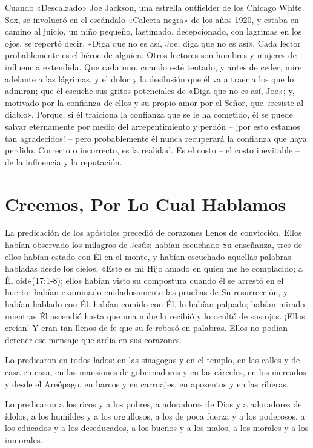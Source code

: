 \documentclass[12pt, twoside, openright]{book}
\begin{document}
Cuando «Descalzado» Joe Jackson, una estrella outfielder de los Chicago White Sox, se involucró en el escándalo «Calceta negra» de los años 1920, y estaba en camino al juicio, un niño pequeño, lastimado, decepcionado, con lagrimas en los ojos, se reportó decir, «Diga que no es así, Joe, diga que no es así». Cada lector probablemente es el héroe de alguien. Otros lectores son hombres y mujeres de influencia extendida. Que cada uno, cuando esté tentado, y antes de ceder, mire adelante a las lágrimas, y el dolor y la desilusión que él va a traer a los que lo admiran; que él escuche sus gritos potenciales de «Diga que no es así, Joe»; y, motivado por la confianza de ellos y su propio amor por el Señor, que «resiste al diablo». Porque, si él traiciona la confianza que se le ha cometido, él se puede salvar eternamente por medio del arrepentimiento y perdón – ¡por esto estamos tan agradecidos! – pero probablemente él nunca recuperará la confianza que haya perdido. Correcto o incorrecto, es la realidad. Es el costo – el costo inevitable – de la influencia y la reputación.

\section{Creemos, Por Lo Cual Hablamos}
La predicación de los apóstoles precedió de corazones llenos de convicción. Ellos habían observado los milagros de Jesús; habían escuchado Su enseñanza, tres de ellos habían estado con Él en el monte, y habían escuchado aquellas palabras habladas desde los cielos, «Este es mi Hijo amado en quien me he complacido; a Él oíd»(17:1-8); ellos habían visto su compostura cuando él se arrestó en el huerto; habían examinado cuidadosamente las pruebas de Su resurrección, y habían hablado con Él, habían comido con Él, lo habían palpado; habían mirado mientras Él ascendió hasta que una nube lo recibió y lo ocultó de sus ojos. ¡Ellos creían! Y eran tan llenos de fe que su fe rebosó en palabras. Ellos no podían detener ese mensaje que ardía en sus corazones. 

Lo predicaron en todos lados: en las sinagogas y en el templo, en las calles y de casa en casa, en las mansiones de gobernadores y en las cárceles, en los mercados y desde el Areópago, en barcos y en carruajes, en aposentos y en las riberas. 

Lo predicaron a los ricos y a los pobres, a adoradores de Dios y a adoradores de ídolos, a los humildes y a los orgullosos, a los de poca fuerza y a los poderosos, a los educados y a los deseducados, a los buenos y a los malos, a los morales y a los inmorales.
\end{document}
